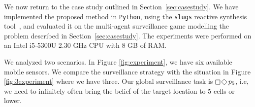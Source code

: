 We now return to the case study outlined in Section~\ref{sec:casestudy}. We have implemented the proposed method in \texttt{Python}, using the \texttt{slugs} reactive synthesis tool~\cite{EhlersR16}, and evaluated it on the multi-agent surveillance game modelling the problem described in Section~\ref{sec:casestudy}. The experiments were performed on an Intel i5-5300U 2.30 GHz CPU with 8 GB of RAM.

 We analyzed two scenarios. In Figure \ref{fig:experiment}, we have six available mobile sensors. We compare the surveillance strategy with the situation in Figure \ref{fig:3experiment} where we have three. Our global surveillance task is $\LTLsquare \LTLdiamond p_5$, i.e, we need to infinitely often bring the belief of the target location to 5 cells or lower. 

\begin{figure}
	\centering
{}
{}
\end{figure}
